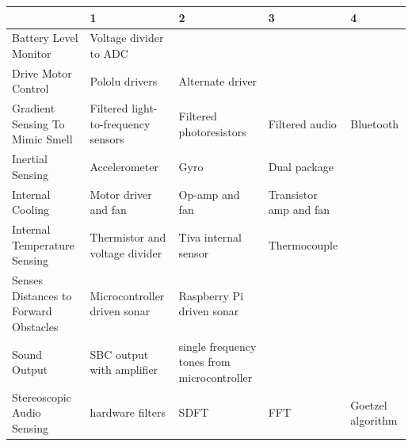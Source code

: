 \documentclass{article}
\begin{document}
        \begin{table}
            \centering
            \begin{tabularx}{\textwidth}{|X||Y|Y|Y|Y|}
                \hline
                    & 1
                    & 2
                    & 3
                    & 4
                \\ \hline
                Battery Level Monitor
                    & Voltage divider to ADC
                    &
                    &
                    &
                \\ \hline
                Drive Motor Control
                    & Pololu drivers
                    & Alternate driver
                    &
                    &
                \\ \hline
                Gradient Sensing To Mimic Smell
                    & Filtered light-to-frequency sensors
                    & Filtered photoresistors
                    & Filtered audio
                    & Bluetooth
                \\ \hline
                Inertial Sensing
                    & Accelerometer
                    & Gyro
                    & Dual package
                    &
                \\ \hline
                Internal Cooling
                    & Motor driver and fan
                    & Op-amp and fan
                    & Transistor amp and fan
                    &
                \\ \hline
                Internal Temperature Sensing
                    & Thermistor and voltage divider
                    & Tiva internal sensor
                    & Thermocouple
                    &
                \\ \hline
                Senses Distances to Forward Obstacles
                    & Microcontroller driven sonar
                    & Raspberry Pi driven sonar
                    &
                    &
                \\ \hline
                Sound Output
                    & SBC output with amplifier
                    & single frequency tones from microcontroller
                    &
                    &
                \\ \hline
                Stereoscopic Audio Sensing
                    & hardware filters
                    & SDFT
                    & FFT
                    & Goetzel algorithm \\ \hline

\end{tabularx}
\end{table}
\end{document}
